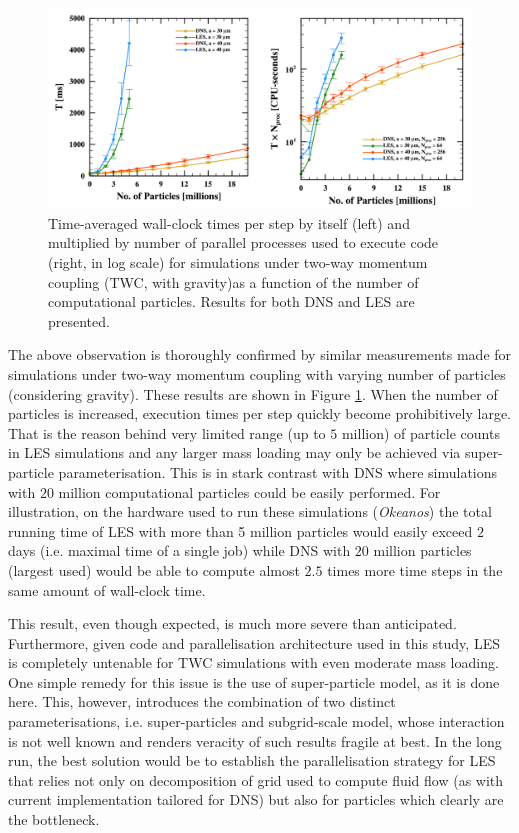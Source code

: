 \documentclass{pracamgren}
\begin{document}
\begin{figure}[h]
\centering
\includegraphics[width=13.5cm]{figures/3-03_pfstwc.pdf}
\caption{
Time-averaged wall-clock times per step by itself (left) and multiplied by number of parallel processes used to execute code (right, in log scale) for simulations under two-way momentum coupling (TWC, with gravity)as a function of  the number of computational particles. 
Results for both DNS and LES are presented.
}
\label{fig:pfstwc}
\end{figure}

The above observation is thoroughly confirmed by similar measurements made for simulations under two-way momentum coupling with varying number of particles (considering gravity).
These results are shown in Figure \ref{fig:pfstwc}.
When the number of particles is increased, execution times per step quickly become prohibitively large.
That is the reason behind very limited range (up to $5$ million) of particle counts in LES simulations and any larger mass loading may only be achieved via super-particle parameterisation.
This is in stark contrast with DNS where simulations with $20$ million computational particles could be easily performed.
For illustration, on the hardware used to run these simulations (\emph{Okeanos}) the total running time of LES with more than 5 million particles would easily exceed $2$ days (i.e. maximal time of a single job) while DNS with $20$ million particles (largest used) would be able to compute almost $2.5$ times more time steps in the same amount of wall-clock time.

This result, even though expected, is much more severe than anticipated.
Furthermore, given code and parallelisation architecture used in this study, LES is completely untenable for TWC simulations with even moderate mass loading.
One simple remedy for this issue is the use of super-particle model, as it is done here.
This, however, introduces the combination of two distinct parameterisations, i.e. super-particles and subgrid-scale model, whose interaction is not well known and renders veracity of such results fragile at best.
In the long run, the best solution would be to establish the parallelisation strategy for LES that relies not only on decomposition of grid used to compute fluid flow (as with current implementation tailored for DNS) but also for particles which clearly are the bottleneck.
\end{document}
